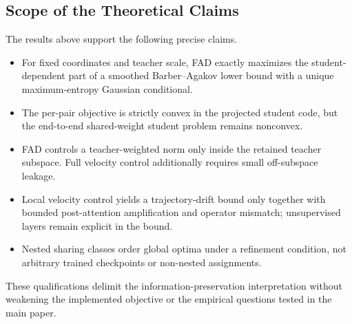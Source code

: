 \documentclass{article}
\theoremstyle{plain}
\theoremstyle{definition}
\theoremstyle{remark}
\begin{document}
\subsection{Scope of the Theoretical Claims}
\label{app:theory-scope}

The results above support the following precise claims.
\begin{itemize}\itemsep2pt
  \item For fixed coordinates and teacher scale, FAD exactly maximizes the
  student-dependent part of a smoothed Barber--Agakov lower bound with a unique
  maximum-entropy Gaussian conditional.
  \item The per-pair objective is strictly convex in the projected student code,
  but the end-to-end shared-weight student problem remains nonconvex.
  \item FAD controls a teacher-weighted norm only inside the retained teacher
  subspace.  Full velocity control additionally requires small off-subspace
  leakage.
  \item Local velocity control yields a trajectory-drift bound only together with
  bounded post-attention amplification and operator mismatch; unsupervised layers
  remain explicit in the bound.
  \item Nested sharing classes order global optima under a refinement condition,
  not arbitrary trained checkpoints or non-nested assignments.
\end{itemize}
These qualifications delimit the information-preservation interpretation without
weakening the implemented objective or the empirical questions tested in the main
paper.


\end{document}
